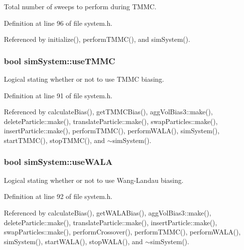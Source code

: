 Total number of sweeps to perform during T\-M\-M\-C. 



Definition at line 96 of file system.\-h.



Referenced by initialize(), perform\-T\-M\-M\-C(), and sim\-System().

\hypertarget{classsim_system_aa474a50b6353c8897331b1ab1ce53ab1}{
\subsubsection[{use\-T\-M\-M\-C}]{\setlength{\rightskip}{0pt plus 5cm}bool sim\-System\-::use\-T\-M\-M\-C}}\label{classsim_system_aa474a50b6353c8897331b1ab1ce53ab1}


Logical stating whether or not to use T\-M\-M\-C biasing. 



Definition at line 91 of file system.\-h.



Referenced by calculate\-Bias(), get\-T\-M\-M\-C\-Bias(), agg\-Vol\-Bias3\-::make(), delete\-Particle\-::make(), translate\-Particle\-::make(), swap\-Particles\-::make(), insert\-Particle\-::make(), perform\-T\-M\-M\-C(), perform\-W\-A\-L\-A(), sim\-System(), start\-T\-M\-M\-C(), stop\-T\-M\-M\-C(), and $\sim$sim\-System().

\hypertarget{classsim_system_aa83b00006b3919fb6e13f1bdeadece6a}{
\subsubsection[{use\-W\-A\-L\-A}]{\setlength{\rightskip}{0pt plus 5cm}bool sim\-System\-::use\-W\-A\-L\-A}}\label{classsim_system_aa83b00006b3919fb6e13f1bdeadece6a}


Logical stating whether or not to use Wang-\/\-Landau biasing. 



Definition at line 92 of file system.\-h.



Referenced by calculate\-Bias(), get\-W\-A\-L\-A\-Bias(), agg\-Vol\-Bias3\-::make(), delete\-Particle\-::make(), translate\-Particle\-::make(), insert\-Particle\-::make(), swap\-Particles\-::make(), perform\-Crossover(), perform\-T\-M\-M\-C(), perform\-W\-A\-L\-A(), sim\-System(), start\-W\-A\-L\-A(), stop\-W\-A\-L\-A(), and $\sim$sim\-System().

